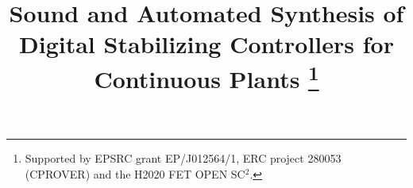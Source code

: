 \documentclass[final]{sig-alternate-05-2015}
\begin{document}

\title{
Sound and Automated Synthesis of Digital Stabilizing Controllers for Continuous
Plants%
\thanks{Supported by EPSRC grant EP/J012564/1,
ERC project 280053 (CPROVER) and the H2020 FET OPEN SC$^2$.}}

%
%
%
%
%
\end{document}
